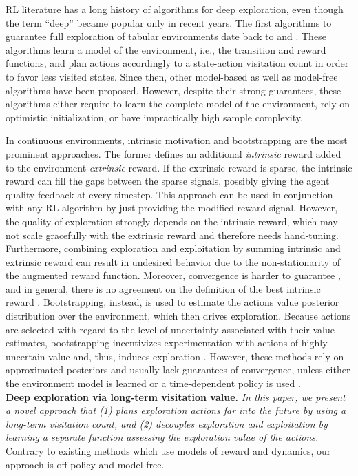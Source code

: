 \documentclass{article}
\begin{document}
RL literature has a long history of algorithms for deep exploration, even though the term ``deep'' became popular only in recent years.
The first algorithms to guarantee full exploration of tabular environments date back to \citet{kearns2002near} and \citet{brafman2002r}. These algorithms learn a model of the environment, i.e., the transition and reward functions, and plan actions accordingly to a state-action visitation count in order to favor less visited states.
Since then, other model-based \citep{jaksch2010near,hester2013texplore} as well as model-free algorithms \citep{strehl2006pac,bellemare2016unifying,jin2018iq,dong2019q} have been proposed. However, despite their strong guarantees, these algorithms either require to learn the complete model of the environment, rely on optimistic initialization, or have impractically high sample complexity.

In continuous environments, intrinsic motivation and bootstrapping are the most prominent approaches.
The former defines an additional \textit{intrinsic} reward added to the environment \textit{extrinsic} reward. If the extrinsic reward is sparse, the intrinsic reward can fill the gaps between the sparse signals, possibly giving the agent quality feedback at every timestep. This approach can be used in conjunction with any RL algorithm by just providing the modified reward signal. 
However, the quality of exploration strongly depends on the intrinsic reward, which may not scale gracefully with the extrinsic reward and therefore needs hand-tuning. Furthermore, combining exploration and exploitation by summing intrinsic and extrinsic reward can result in undesired behavior due to the non-stationarity of the augmented reward function.
Moreover, convergence is harder to guarantee \citep{kolter2009near}, and in general, there is no agreement on the definition of the best intrinsic reward \citep{houthooft2016vime,pathak2017curiosity}.
Bootstrapping, instead, is used to estimate the actions value posterior distribution over the environment, which then drives exploration. Because actions are selected with regard to the level of uncertainty associated with their value estimates, bootstrapping incentivizes experimentation with actions of highly uncertain value and, thus, induces exploration \citep{osband2019deep}.
However, these methods rely on approximated posteriors and usually lack guarantees of convergence, unless either the environment model is learned or a time-dependent policy is used \citep{osband2019deep}.
\\[5pt]
\textbf{Deep exploration via long-term visitation value.}
\textit{In this paper, we present a novel approach that (1) plans exploration actions far into the future by using a long-term visitation count, and (2) decouples exploration and exploitation by learning a separate function assessing the exploration value of the actions.}
Contrary to existing methods which use models of reward and dynamics, our approach is off-policy and model-free. 
\end{document}
